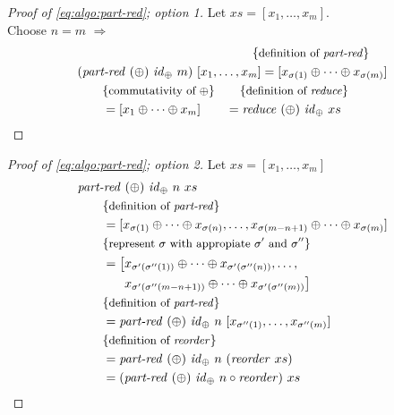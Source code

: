 \begin{proof}[Proof of \autoref{eq:algo:part-red}; option 1]
  Let $xs = [x_1, \ldots, x_m]$.\\
  Choose $n=m$ $\Rightarrow$
  \begin{align*}
    &\qquad\qquad\qquad\qquad\qquad\qquad\qquad \comment{definition of \partRed}\\
    &(\partRed\ (\oplus)\ \id_\oplus\ m)\ [x_1, \ldots, x_m] = [x_{\sigma(1)} \oplus \dots \oplus x_{\sigma(m)}]\\
    &\qquad \comment{commutativity of $\oplus$} \qquad \comment{definition of \reduce}\\
    &\qquad = [x_1 \oplus \dots \oplus x_m]\qquad = \reduce\ (\oplus)\ \id_\oplus\ xs
  \end{align*}
\end{proof}
\begin{proof}[Proof of \autoref{eq:algo:part-red}; option 2]
  Let $xs = [x_1, \ldots, x_m]$
  \begin{align*}
    &\text{\textit{part-red}}\ (\oplus)\ \text{\textit{id}}_\oplus\ n\ xs\\
    &\qquad \{\text{\small definition of \text{\textit{part-red}}}\}\\
    &\qquad = [x_{\sigma(1)} \oplus \dots \oplus x_{\sigma(n)}, \ldots, x_{\sigma(m-n+1)} \oplus \dots \oplus x_{\sigma(m)}]\\
    &\qquad \{\text{\small represent $\sigma$ with appropiate $\sigma'$ and $\sigma''$}\}\\
    &\qquad =
      \begin{aligned}[t]
        \big[&x_{\sigma'(\sigma''(1))} \oplus \dots \oplus x_{\sigma'(\sigma''(n))}, \ldots,\\
         &x_{\sigma'(\sigma''(m-n+1))} \oplus \dots \oplus x_{\sigma'(\sigma''(m))}\big]
       \end{aligned}\\
    &\qquad \{\text{\small definition of \text{\textit{part-red}}}\}\\
    &\qquad = \text{\textit{part-red}}\ (\oplus)\ \text{\textit{id}}_\oplus\ n\ [x_{\sigma''(1)}, \ldots, x_{\sigma''(m)}]\\
    &\qquad \{\text{\small definition of \text{\textit{reorder}}}\}\\
    &\qquad = \text{\textit{part-red}}\ (\oplus)\ \text{\textit{id}}_\oplus\ n\ (\text{\textit{reorder}}\ xs)\\
    &\qquad = (\text{\textit{part-red}}\ (\oplus)\ \text{\textit{id}}_\oplus\ n \circ \text{\textit{reorder}})\ xs
  \end{align*}
\end{proof}

